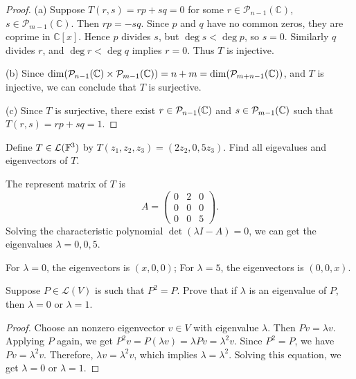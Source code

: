\documentclass{article}
\begin{document}
\begin{proof}
  (a) Suppose $T(r,s)=rp+sq=0$ for some $r\in\mathcal{P}_{n-1}(\mathbb{C})$, $s\in\mathcal{P}_{m-1}(\mathbb{C})$. Then $rp=-sq$. Since $p$ and $q$ have no common zeros, they are coprime in $\mathbb{C}[x]$. Hence $p$ divides $s$, but $\deg s<\deg p$, so $s=0$. Similarly $q$ divides $r$, and $\deg r<\deg q$ implies $r=0$. Thus $T$ is injective.\par
  (b) Since \( \dim(\mathcal{P}_{n-1}(\mathbb{C})\times \mathcal{P}_{m-1}(\mathbb{C}))=n+m=\dim(\mathcal{P}_{m+n-1}(\mathbb{C})) \), and \( T \) is injective, we can conclude that \( T \) is surjective. \par
  (c) Since \( T \) is surjective, there exist \( r\in \mathcal{P}_{n-1}(\mathbb{C}) \) and \( s\in \mathcal{P}_{m-1}(\mathbb{C}) \) such that \( T(r,s)=rp+sq=1 \).
\end{proof}

\begin{problem}[5A-7]
  Define \( T\in \mathcal{L}(\mathbb{F}^3) \) by \( T(z_1,z_2,z_3)=(2z_2,0,5z_3) \). Find all eigevalues and eigenvectors of \( T \). 
\end{problem}

\begin{solution}
  The represent matrix of \( T \) is
  \[ A=\left(\begin{matrix}
    0 & 2 & 0\\
    0 & 0 & 0\\
    0 & 0 & 5
  \end{matrix}\right). \] 
  Solving the characteristic polynomial \( \det(\lambda I - A) = 0 \), we can get the eigenvalues \( \lambda = 0,0,5 \). \par
  For \( \lambda = 0 \), the eigenvectors is \( (x,0,0) \); For \( \lambda=5 \), the eigenvectors is \( (0,0,x) \).
\end{solution}

\begin{problem}[5A-8]
  Suppose $P\in\mathcal{L}(V)$ is such that $P^2=P$. Prove that if $\lambda$ is an eigenvalue of $P$, then $\lambda=0$ or $\lambda=1$.
\end{problem}

\begin{proof}
  Choose an nonzero eigenvector \( v\in V \) with eigenvalue \( \lambda \). Then \( Pv = \lambda v \). Applying \( P \) again, we get \( P^2v = P(\lambda v) = \lambda Pv = \lambda^2 v \). Since \( P^2 = P \), we have \( Pv = \lambda^2 v \). Therefore, \( \lambda v = \lambda^2 v \), which implies \( \lambda = \lambda^2 \). Solving this equation, we get \( \lambda = 0 \) or \( \lambda = 1 \).
\end{proof}
\end{document}
